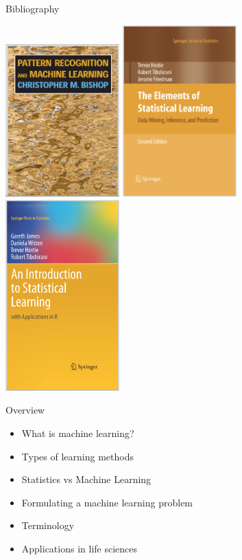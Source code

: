 \documentclass[pdf]{beamer}
\newif\ifplacelogo %
\begin{document}
\begin{frame}{Bibliography}
\begin{center}
	\includegraphics[width=0.33\textwidth, height=0.65\textheight]{bookBishop.png}
	\includegraphics[width=0.33\textwidth, height=0.65\textheight]{bookHastie.png}
	\includegraphics[width=0.33\textwidth, height=0.65\textheight]{bookJames.png}
\end{center}
\end{frame}
\placelogofalse %
\begin{frame}{Overview}
\begin{itemize}\addtolength{\itemsep}{0.5\baselineskip}
	\item<2-> What is machine learning?
	\item<3-> Types of learning methods
	\item<4-> Statistics vs Machine Learning
	\item<5-> Formulating a machine learning problem
	\item<6-> Terminology
	\item<7-> Applications in life sciences
\end{itemize}
\end{frame}
\end{document}
